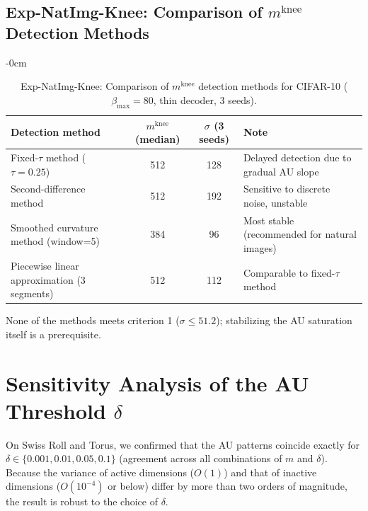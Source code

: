 \documentclass[make,article,submit,pdftex,moreauthors]{Definitions/mdpi}
\newcommand{\mknee}{m^{\mathrm{knee}}}
\begin{document}
\subsection*{Exp-NatImg-Knee: Comparison of $\mknee$ Detection Methods}

\begin{table}[H]
\begin{adjustwidth}{-\extralength}{0cm}
\centering
\caption{Exp-NatImg-Knee: Comparison of $\mknee$ detection methods for CIFAR-10 ($\beta_\mathrm{max}=80$, thin decoder, 3 seeds).}
\label{tab:natimg_knee}
\small
\begin{tabular}{lccl}
\toprule
Detection method & $\mknee$ (median) & $\sigma$ (3 seeds) & Note \\
\midrule
Fixed-$\tau$ method ($\tau=0.25$) & 512 & 128 & Delayed detection due to gradual AU slope \\
Second-difference method & 512 & 192 & Sensitive to discrete noise, unstable \\
Smoothed curvature method (window=5) & 384 & 96 & Most stable (recommended for natural images) \\
Piecewise linear approximation (3 segments) & 512 & 112 & Comparable to fixed-$\tau$ method \\
\bottomrule
\end{tabular}
\end{adjustwidth}
\end{table}

None of the methods meets criterion 1 ($\sigma \leq 51.2$); stabilizing the AU saturation itself is a prerequisite.

\section[\appendixname~\thesection]{Sensitivity Analysis of the AU Threshold $\delta$}\label{app:delta}

On Swiss Roll and Torus, we confirmed that the AU patterns coincide exactly for
$\delta \in \{0.001, 0.01, 0.05, 0.1\}$ (agreement across all combinations of $m$ and $\delta$).
Because the variance of active dimensions ($O(1)$) and that of inactive dimensions ($O(10^{-4})$ or below)
differ by more than two orders of magnitude, the result is robust to the choice of $\delta$.
\end{document}
